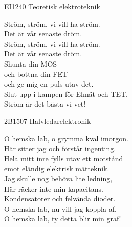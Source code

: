 \documentclass[a6paper,10pt]{article}
\begin{document}
\setlength{\oddsidemargin}{-0.47in}
\noindent
\begin{center}
\footnotesize EI1240 Teoretisk elektroteknik\\
\end{center}
\begin{lyrics}
Ström, ström, vi vill ha ström. \\
Det är vår senaste dröm. \\
Ström, ström, vi vill ha ström. \\
Det är vår senaste dröm. 
\vspace{5pt} \\
Shunta din MOS \\
och bottna din FET \\
och ge mig en puls utav det. \\
Slut upp i kampen för Elmät och TET. \\
Ström är det bästa vi vet! 
\end{lyrics}
\vspace{20pt} 
\begin{center}
\footnotesize2B1507 Halvledarelektronik\\
\end{center}
\begin{lyrics}
O hemska lab, o grymma kval imorgon. \\
Här sitter jag och förstår ingenting. \\
Hela mitt inre fylls utav ett motstånd \\
emot eländig elektrisk mätteknik. 
\vspace{5pt} \\
Jag skulle nog behöva lite ledning, \\
Här räcker inte min kapacitans. 
\vspace{5pt} \\
Kondensatorer och felvända dioder. \\
O hemska lab, nu vill jag koppla af. \\
O hemska lab, ty detta blir min graf! 
\end{lyrics}

\newpage
\setlength{\oddsidemargin}{-0.37in}
\noindent
\end{document}
